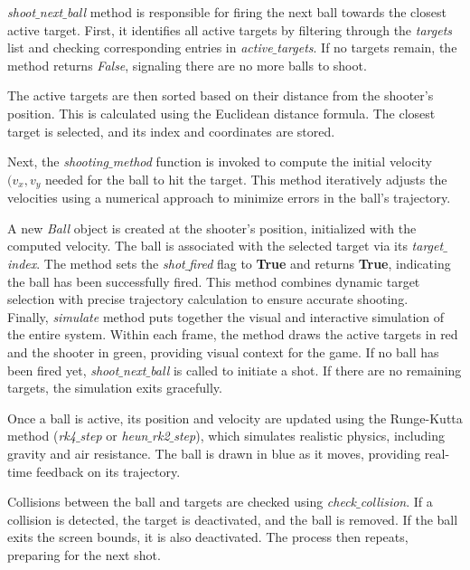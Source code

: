 \documentclass{article}
\begin{document}
\textit{shoot$\_$next$\_$ball} method is responsible for firing the next ball towards the closest active target. First, it identifies all active targets by filtering through the \textit{targets} list and checking corresponding entries in \textit{active$\_$targets}. If no targets remain, the method returns \textit{False}, signaling there are no more balls to shoot.

The active targets are then sorted based on their distance from the shooter’s position. This is calculated using the Euclidean distance formula. The closest target is selected, and its index and coordinates are stored.

Next, the \textit{shooting$\_$method} function is invoked to compute the initial velocity $(v_x, v_y$ needed for the ball to hit the target. This method iteratively adjusts the velocities using a numerical approach to minimize errors in the ball's trajectory.

A new \textit{Ball} object is created at the shooter’s position, initialized with the computed velocity. The ball is associated with the selected target via its \textit{target$\_$index}. The method sets the \textit{shot$\_$fired} flag to \textbf{True} and returns \textbf{True}, indicating the ball has been successfully fired. This method combines dynamic target selection with precise trajectory calculation to ensure accurate shooting. \\

Finally, \textit{simulate} method puts together the visual and interactive simulation of the entire system. Within each frame, the method draws the active targets in red and the shooter in green, providing visual context for the game. If no ball has been fired yet, \textit{shoot$\_$next$\_$ball} is called to initiate a shot. If there are no remaining targets, the simulation exits gracefully.

Once a ball is active, its position and velocity are updated using the Runge-Kutta method (\textit{rk4$\_$step} or \textit{heun$\_$rk2$\_$step}), which simulates realistic physics, including gravity and air resistance. The ball is drawn in blue as it moves, providing real-time feedback on its trajectory.

Collisions between the ball and targets are checked using \textit{check$\_$collision}. If a collision is detected, the target is deactivated, and the ball is removed. If the ball exits the screen bounds, it is also deactivated. The process then repeats, preparing for the next shot.
\end{document}
